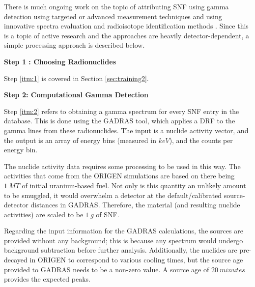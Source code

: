 There is much ongoing work on the topic of attributing \gls{SNF} using gamma
detection using targeted or advanced measurement techniques \cite{snf_gamma,
compton_supp, bwr_high-res_gamma, pwr_bwr_gamma} and using innovative spectra
evaluation and radioisotope identification methods \cite{riid_09,
rapid_riid_18, sull_gen_07, sull_valid_15, sull_auto_17, sull_unc_17}.  Since
this is a topic of active research and the approaches are heavily
detector-dependent, a simple processing approach is described below.

\noindent \textbf{Step 1 : Choosing Radionuclides}

Step \ref{itm:1} is covered in Section \ref{sec:training2}.  

\noindent \textbf{Step 2: Computational Gamma Detection}

Step \ref{itm:2} refers to obtaining a gamma spectrum for every \gls{SNF} entry
in the database.  This is done using the \gls{GADRAS} tool, which applies a
\gls{DRF} to the gamma lines from these radionuclides. The input is a nuclide
activity vector, and the output is an array of energy bins (measured in $keV$),
and the counts per energy bin.

The nuclide activity data requires some processing to be used in this way.  The
activities that come from the \gls{ORIGEN} simulations are based on there being
$1\:MT$ of initial uranium-based fuel. Not only is this quantity an unlikely
amount to be smuggled, it would overwhelm a detector at the default/calibrated
source-detector distances in \gls{GADRAS}.  Therefore, the material (and
resulting nuclide activities) are scaled to be $1\:g$ of \gls{SNF}.


Regarding the input information for the \gls{GADRAS} calculations, the sources
are provided without any background; this is because any spectrum would undergo
background subtraction before further analysis. Additionally, the nuclides are
pre-decayed in \gls{ORIGEN} to correspond to various cooling times, but the
source age provided to \gls{GADRAS} needs to be a non-zero value. A source age
of $20\:minutes$  provides the expected peaks.

